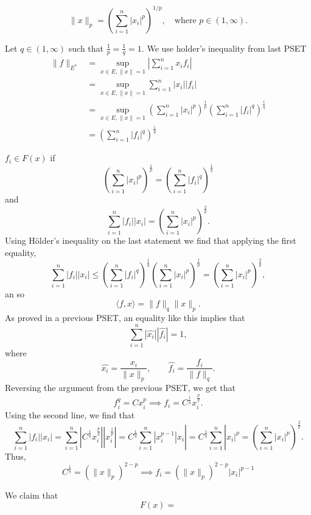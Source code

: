 \documentclass[11pt]{article}
\begin{document}
\begin{problem}
\begin{enumerate}
\[
    \|x\|_p = \left( \sum_{i=1}^{n} |x_i|^p \right)^{1/p}, \quad \text{where } p \in (1, \infty).
    \]
    \begin{solution}
    Let $q\in (1,\infty)$ such that $\frac{1}{p} = \frac{1}{q} = 1.$ We use holder's inequality from last PSET
        \begin{align*}
            \|f\|_{E^\ast} &= \sup_{x \in E, \|x\| = 1} |\sum_{i=1}^n x_if_i|\\
            &= \sup_{x \in E, \|x\| = 1} \sum_{i=1}^n |x_i||f_i|\\
            &=\sup_{x \in E, \|x\| = 1} \left(\sum_{i=1}^n |x_i|^p\right)^\frac{1}{p}\left( \sum_{i=1}^n |f_i|^q\right)^\frac{1}{q}\\
            &= \left(\sum_{i=1}^n |f_i|^q\right)^\frac{1}{q}
        \end{align*}
    \end{solution}
\begin{solution}
    $f_i \in F(x)$ if 
    \[\left(\sum_{i=1}^n |x_i|^p\right)^\frac{1}{p} = \left(\sum_{i=1}^n |f_i|^q\right)^\frac{1}{q}\]
    and 
    \[\sum_{i=1}^n|f_i||x_i| = \left(\sum_{i=1}^n |x_i|^p\right)^\frac{2}{p}.\] Using H\"older's inequality on the last statement we find that applying the first equality,
    \[\sum_{i=1}^n|f_i||x_i| \leq \left(\sum_{i=1}^n |f_i|^q\right)^\frac{1}{q}\left(\sum_{i=1}^n |x_i|^p\right)^\frac{1}{p} = \left(\sum_{i=1}^n |x_i|^p\right)^\frac{2}{p},\] an so
    \[\langle f, x\rangle = \|f\|_q\|x\|_p.\] As proved in a previous PSET, an equality like this implies that 
    \[\sum_{i=1}^n |\hat{x_i}||\hat{f_i}| = 1,\] where
    \[\hat{x_i} = \frac{x_i}{\|x\|_p}, \qquad \hat{f_i} = \frac{f_i}{\|f\|_q}.\] Reversing the argument from the previous PSET, we get that
    \[f_i^q = Cx_i^p \implies f_i = C^\frac{1}{q}x_i^\frac{p}{q}.\] Using the second line, we find that 
    \[\sum_{i=1}^n |f_i||x_i| = \sum_{i=1}^n |C^\frac{1}{q}x_i^\frac{p}{q}||x_i^\frac{1}{p}| = C^\frac{1}{q} \sum_{i=1}^n |x_i^{p-1}|x_i| = C^\frac{1}{q}\sum_{i=1}^n |x_i|^p = \left(\sum_{i=1}^n |x_i|^p\right)^\frac{2}{p}.\]
    Thus, 
    \[C^\frac{1}{q} = (\|x\|_p)^{2-p} \implies f_i= (\|x\|_p)^{2-p} |x_i|^{p-1}\]

    We claim that 
    \[F(x) = \]
\end{solution}


\end{enumerate}

\end{problem}

\newpage
\end{document}
